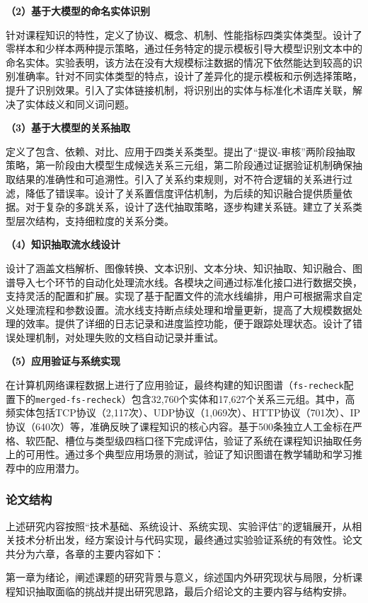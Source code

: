 \textbf{（2）基于大模型的命名实体识别}

针对课程知识的特性，定义了协议、概念、机制、性能指标四类实体类型。设计了零样本和少样本两种提示策略，通过任务特定的提示模板引导大模型识别文本中的命名实体。实验表明，该方法在没有大规模标注数据的情况下依然能达到较高的识别准确率。针对不同实体类型的特点，设计了差异化的提示模板和示例选择策略，提升了识别效果。引入了实体链接机制，将识别出的实体与标准化术语库关联，解决了实体歧义和同义词问题。

\textbf{（3）基于大模型的关系抽取}

定义了包含、依赖、对比、应用于四类关系类型。提出了“提议-审核”两阶段抽取策略，第一阶段由大模型生成候选关系三元组，第二阶段通过证据验证机制确保抽取结果的准确性和可追溯性。引入了关系约束规则，对不符合逻辑的关系进行过滤，降低了错误率。设计了关系置信度评估机制，为后续的知识融合提供质量依据。对于复杂的多跳关系，设计了迭代抽取策略，逐步构建关系链。建立了关系类型层次结构，支持细粒度的关系分类。

\textbf{（4）知识抽取流水线设计}

设计了涵盖文档解析、图像转换、文本识别、文本分块、知识抽取、知识融合、图谱导入七个环节的自动化处理流水线。各模块之间通过标准化接口进行数据交换，支持灵活的配置和扩展。实现了基于配置文件的流水线编排，用户可根据需求自定义处理流程和参数设置。流水线支持断点续处理和增量更新，提高了大规模数据处理的效率。提供了详细的日志记录和进度监控功能，便于跟踪处理状态。设计了错误处理机制，对处理失败的文档自动记录并重试。

\textbf{（5）应用验证与系统实现}

在计算机网络课程数据上进行了应用验证，最终构建的知识图谱（\texttt{fs-recheck}配置下的\texttt{merged-fs-recheck}）包含32,760个实体和17,627个关系三元组。其中，高频实体包括TCP协议（2,117次）、UDP协议（1,069次）、HTTP协议（701次）、IP协议（640次）等，准确反映了课程知识的核心内容。基于500条独立人工金标在严格、软匹配、槽位与类型级四档口径下完成评估，验证了系统在课程知识抽取任务上的可用性。通过多个典型应用场景的测试，验证了知识图谱在教学辅助和学习推荐中的应用潜力。

\subsubsection{论文结构}

上述研究内容按照“技术基础、系统设计、系统实现、实验评估”的逻辑展开，从相关技术分析出发，经方案设计与代码实现，最终通过实验验证系统的有效性。论文共分为六章，各章的主要内容如下：

第一章为绪论，阐述课题的研究背景与意义，综述国内外研究现状与局限，分析课程知识抽取面临的挑战并提出研究思路，最后介绍论文的主要内容与结构安排。

